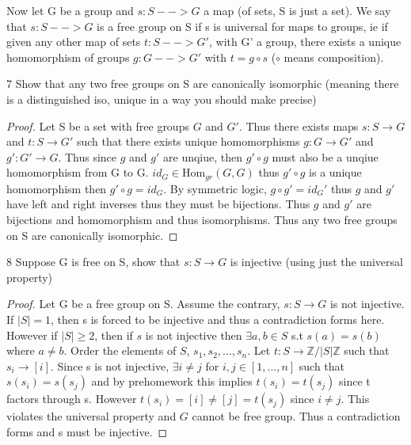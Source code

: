 \documentclass{article}
\newcommand{\Z}{\mathbb{Z}}
\newcommand{\abs}[1]{\lvert #1\rvert}
\newcommand{\Hom}[0]{\text{Hom}}
\begin{document}
Now let G be a group and $s: S --> G$ a map (of sets, S is just a set). We say that  $s: S --> G$ is a free group on S if s is universal for maps to groups, ie if given any other map of sets $t: S --> G'$, with G' a group, there exists a unique homomorphism of groups   $g: G --> G'$ with  $t = g \circ s $  ($\circ$ means composition). 


\bigskip

\begin{PROB}{7}\label{Problem 7.}
    Show that any two free groups on S are canonically isomorphic (meaning there is a distinguished iso, unique in a way you should make precise)
\end{PROB}
\begin{proof}
    Let S be a set with free groups $G$ and $G'$. Thus there exists maps $s: S \to G$ and $t: S \to G'$ such that there exists unique homomorphisms $g: G \to G'$ and $g': G' \to G$. Thus since $g$ and $g'$ are unqiue, then $g' \circ g$ must also be a unqiue homomorphism from G to G. $id_G \in \Hom_{gr}(G, G)$ thus $g' \circ g$ is a unique homomorphism then $g' \circ g = id_G$. By symmetric logic, $g \circ g' = id_G'$ thus $g$ and $g'$ have left and right inverses thus they must be bijections. Thus $g$ and $g'$ are bijections and homomorphism and thus isomorphisms. Thus any two free groups on S are canonically isomorphic.
\end{proof}

\bigskip

\begin{PROB}{8}\label{Problem 8.}
    Suppose G is free on S, show that $s:S \to G$ is injective (using just the universal property)
\end{PROB}
\begin{proof}
    Let G be a free group on S. Assume the contrary, $s: S \to G$ is not injective. If $|S| = 1$, then s is forced to be injective and thus a contradiction forms here. However if $|S| \geq 2$, then if $s$ is not injective then $\exists a, b \in S$ s.t $s(a) = s(b)$ where $a \neq b$. Order the elements of $S$, $s_1, s_2, \ldots, s_n$. Let $t: S \to \Z/\abs{S}\Z$ such that $s_i \to [i]$. Since s is not injective, $\exists i \neq j$ for $i,j \in [1, \ldots, n]$ such that $s(s_i) = s(s_j)$ and by prehomework this implies $t(s_i) = t(s_j)$ since t factors through s. However $t(s_i) = [i] \neq [j] = t(s_j)$ since $i \neq j$. This violates the universal property and $G$ cannot be free group. Thus a contradiction forms and s must be injective. 
\end{proof}
\end{document}

